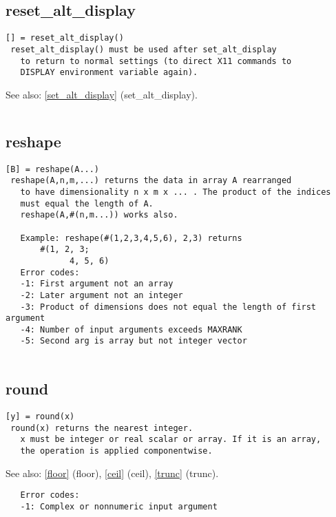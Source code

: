 \documentclass[a4paper]{article}
\begin{document}
\subsection{reset\_alt\_display\label{reset_alt_display}}

\begin{tscreen}
\begin{verbatim}
[] = reset_alt_display()
 reset_alt_display() must be used after set_alt_display
   to return to normal settings (to direct X11 commands to
   DISPLAY environment variable again).
\end{verbatim}

See also: \ref{set_alt_display} {(set\_alt\_display)}.
\begin{verbatim}
\end{verbatim}
\end{tscreen}





\subsection{reshape\label{reshape}}

\begin{tscreen}
\begin{verbatim}
[B] = reshape(A...)
 reshape(A,n,m,...) returns the data in array A rearranged
   to have dimensionality n x m x ... . The product of the indices
   must equal the length of A.
   reshape(A,#(n,m...)) works also.

   Example: reshape(#(1,2,3,4,5,6), 2,3) returns
       #(1, 2, 3;
             4, 5, 6)  
   Error codes:
   -1: First argument not an array
   -2: Later argument not an integer
   -3: Product of dimensions does not equal the length of first argument
   -4: Number of input arguments exceeds MAXRANK
   -5: Second arg is array but not integer vector
   
\end{verbatim}
\end{tscreen}





\subsection{round\label{round}}

\begin{tscreen}
\begin{verbatim}
[y] = round(x)
 round(x) returns the nearest integer.
   x must be integer or real scalar or array. If it is an array,
   the operation is applied componentwise.
\end{verbatim}

See also: \ref{floor} {(floor)}, \ref{ceil} {(ceil)}, \ref{trunc} {(trunc)}.
\begin{verbatim}
   Error codes:
   -1: Complex or nonnumeric input argument 
\end{verbatim}
\end{tscreen}
\end{document}
